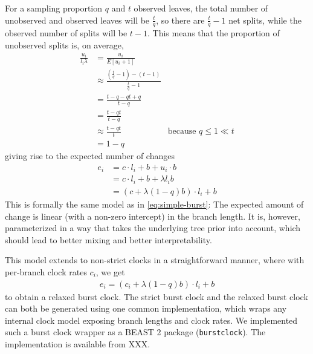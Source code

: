 \documentclass[]{rsos}%
\begin{document}
For a sampling proportion $q$ and $t$ observed leaves, the total number of unobserved and observed leaves will be
$\frac{t}{q}$, so there are $\frac{t}{q} - 1$ net splits,
while the observed number of splits will be $t - 1$. This means that the proportion of unobserved splits is, on average,
\begin{align}
  \frac{u_i}{l_i \lambda}
  &= \frac{u_i}{E[u_i + 1]} \\
  & \approx \frac{(\frac{t}{q} - 1) - (t - 1)}{\frac{t}{q} -1} \\
  & = \frac{t - q - qt + q}{t - q} \\
  & = \frac{t - qt}{t - q} \\
  & \approx \frac{t - qt}{t} &\text{because } q \leq 1 \ll t \\
  & = 1 - q
\end{align}
giving rise to the expected number of changes
\begin{align}
  e_i &= c \cdot l_i + b + u_i \cdot b  \\
  &= c \cdot l_i + b + \lambda l_i b \\
  &= (c + \lambda (1-q) b) \cdot l_i + b
  \label{eq:reparam-burst}
\end{align}
This is formally the same model as in \cref{eq:simple-burst}: The expected amount of change is linear (with a non-zero intercept) in the branch length. It is, however, parameterized
in a way that takes the underlying tree prior into account,
which should lead to better mixing and better interpretability.

This model extends to non-strict clocks in a straightforward manner, where with per-branch clock rates $c_i$, we get
\begin{align}
  e_i = (c_i + \lambda (1-q) b) \cdot l_i + b
  \label{eq:relaxed}
\end{align}
to obtain a relaxed burst clock.
The strict burst clock and the relaxed burst clock can both be generated using one common implementation, which wraps any internal clock model exposing branch lengths and clock rates.
We implemented such a burst clock wrapper as a BEAST 2 package (\texttt{burstclock}).
The implementation is available from XXX.
\end{document}
